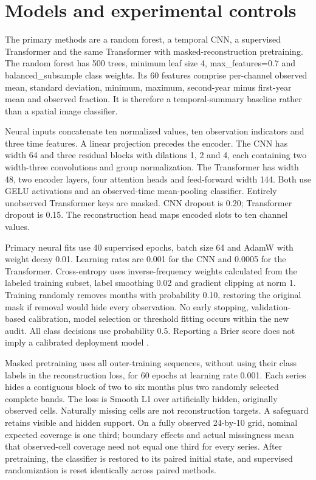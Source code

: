 \documentclass[11pt,a4paper]{article}
\begin{document}
\section{Models and experimental controls}
The primary methods are a random forest, a temporal CNN, a supervised Transformer and the same Transformer with masked-reconstruction pretraining. The random forest \cite{ref5} has 500 trees, minimum leaf size 4, max\_features=0.7 and balanced\_subsample class weights. Its 60 features comprise per-channel observed mean, standard deviation, minimum, maximum, second-year minus first-year mean and observed fraction. It is therefore a temporal-summary baseline rather than a spatial image classifier.

Neural inputs concatenate ten normalized values, ten observation indicators and three time features. A linear projection precedes the encoder. The CNN has width 64 and three residual blocks with dilations 1, 2 and 4, each containing two width-three convolutions and group normalization. The Transformer has width 48, two encoder layers, four attention heads and feed-forward width 144. Both use GELU activations and an observed-time mean-pooling classifier. Entirely unobserved Transformer keys are masked. CNN dropout is 0.20; Transformer dropout is 0.15. The reconstruction head maps encoded slots to ten channel values.

Primary neural fits use 40 supervised epochs, batch size 64 and AdamW with weight decay 0.01. Learning rates are 0.001 for the CNN and 0.0005 for the Transformer. Cross-entropy uses inverse-frequency weights calculated from the labeled training subset, label smoothing 0.02 and gradient clipping at norm 1. Training randomly removes months with probability 0.10, restoring the original mask if removal would hide every observation. No early stopping, validation-based calibration, model selection or threshold fitting occurs within the new audit. All class decisions use probability 0.5. Reporting a Brier score does not imply a calibrated deployment model \cite{ref6}.

Masked pretraining uses all outer-training sequences, without using their class labels in the reconstruction loss, for 60 epochs at learning rate 0.001. Each series hides a contiguous block of two to six months plus two randomly selected complete bands. The loss is Smooth L1 over artificially hidden, originally observed cells. Naturally missing cells are not reconstruction targets. A safeguard retains visible and hidden support. On a fully observed 24-by-10 grid, nominal expected coverage is one third; boundary effects and actual missingness mean that observed-cell coverage need not equal one third for every series. After pretraining, the classifier is restored to its paired initial state, and supervised randomization is reset identically across paired methods.
\end{document}
